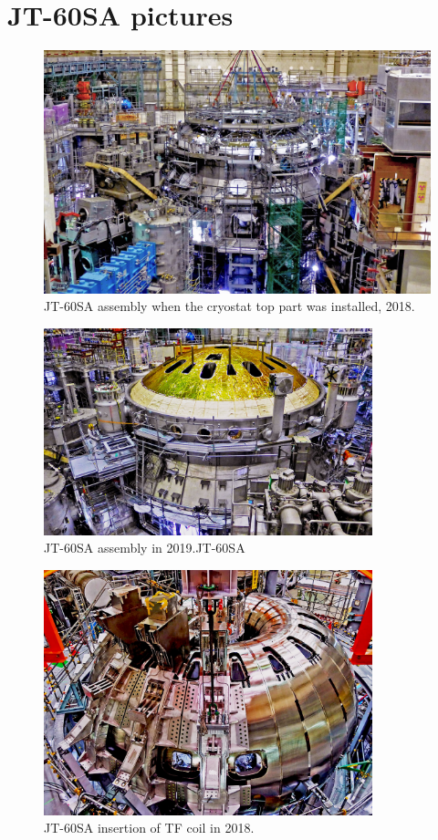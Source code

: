 \chapter{JT-60SA pictures}
\label{JT60_append}
\begin{figure}[h]
	\centering
	\includegraphics[width=1.05\textwidth]{AppCont/image0.jpg}
	\caption{ JT-60SA assembly when the cryostat top part was installed, 2018.\label{figure0}}
\end{figure}
\begin{figure}
	\centering
	\includegraphics[width=0.85\textwidth]{AppCont/image1.jpg}
	\caption{ JT-60SA assembly in 2019.JT-60SA\label{figure1}}
\end{figure}
\begin{figure}
	\centering
	\includegraphics[width=0.85\textwidth]{AppCont/image2.jpg}
	\caption{ JT-60SA insertion of TF coil in 2018.\label{figure2}}
\end{figure}

